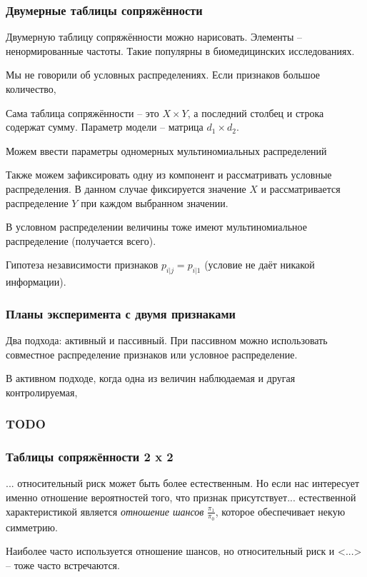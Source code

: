 \documentclass[main.tex]{subfiles}
\begin{document}
\subsubsection{Двумерные таблицы сопряжённости}

Двумерную таблицу сопряжённости можно нарисовать.
Элементы -- ненормированные частоты.
Такие популярны в биомедицинских исследованиях.

Мы не говорили об условных распределениях.
Если признаков большое количество, %

Сама таблица сопряжённости -- это $ X \times Y $, а последний столбец и строка содержат сумму.
Параметр модели -- матрица $ d_1 \times d_2 $.

Можем ввести параметры одномерных мультиномиальных распределений


Также можем зафиксировать одну из компонент и рассматривать условные распределения.
В данном случае фиксируется значение $ X $ и рассматривается распределение $ Y $ при каждом выбранном значении.

В условном распределении величины тоже имеют мультиномиальное распределение (получается всего).


Гипотеза независимости признаков $ p_{i|j}=p_{i|1} $ (условие не даёт никакой информации).

\subsubsection{Планы эксперимента с двумя признаками}

Два подхода: активный и пассивный.
При пассивном можно использовать совместное распределение признаков или условное распределение.

В активном подходе, когда одна из величин наблюдаемая и другая контролируемая, 

\subsubsection{TODO}

\subsubsection{Таблицы сопряжённости 2 x 2}

... относительный риск может быть более естественным.
Но если нас интересует именно отношение вероятностей того, что признак присутствует...
естественной характеристикой является \emph{отношение шансов} $ \frac{\pi_1}{\pi_0} $, которое обеспечивает некую симметрию.

Наиболее часто используется отношение шансов, но относительный риск и <...> -- тоже часто встречаются.
\end{document}
